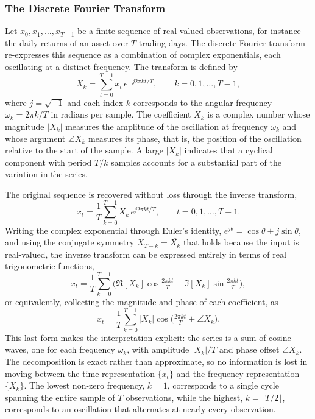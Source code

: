 \documentclass[12pt,a4paper]{article}
\begin{document}
\subsubsection{The Discrete Fourier Transform}
\label{sec:dft}

Let $x_0, x_1, \ldots, x_{T-1}$ be a finite sequence of real-valued
observations, for instance the daily returns of an asset over $T$ trading
days. The discrete Fourier transform re-expresses this sequence as a
combination of complex exponentials, each oscillating at a distinct
frequency. The transform is defined by
\begin{equation}
    X_k = \sum_{t=0}^{T-1} x_t \, e^{-j 2\pi k t / T},
    \qquad k = 0, 1, \ldots, T-1,
\end{equation}
where $j = \sqrt{-1}$ and each index $k$ corresponds to the angular
frequency $\omega_k = 2\pi k / T$ in radians per sample. The coefficient
$X_k$ is a complex number whose magnitude $|X_k|$ measures the amplitude
of the oscillation at frequency $\omega_k$ and whose argument $\angle X_k$
measures its phase, that is, the position of the oscillation relative to
the start of the sample. A large $|X_k|$ indicates that a cyclical
component with period $T/k$ samples accounts for a substantial part of
the variation in the series.

The original sequence is recovered without loss through the inverse
transform,
\begin{equation}
    x_t = \frac{1}{T} \sum_{k=0}^{T-1} X_k \, e^{j 2\pi k t / T},
    \qquad t = 0, 1, \ldots, T-1.
\end{equation}
Writing the complex exponential through Euler's identity, $e^{j\theta} =
\cos\theta + j\sin\theta$, and using the conjugate symmetry $X_{T-k} =
\overline{X_k}$ that holds because the input is real-valued, the inverse
transform can be expressed entirely in terms of real trigonometric
functions,
\begin{equation}
    x_t = \frac{1}{T} \sum_{k=0}^{T-1}
    \Big( \Re[X_k]\cos\tfrac{2\pi k t}{T}
    - \Im[X_k]\sin\tfrac{2\pi k t}{T} \Big),
\end{equation}
or equivalently, collecting the magnitude and phase of each coefficient,
as
\begin{equation}
    x_t = \frac{1}{T} \sum_{k=0}^{T-1}
    |X_k| \cos\!\Big( \tfrac{2\pi k t}{T} + \angle X_k \Big).
\end{equation}
This last form makes the interpretation explicit: the series is a sum of
cosine waves, one for each frequency $\omega_k$, with amplitude
$|X_k|/T$ and phase offset $\angle X_k$. The decomposition is exact
rather than approximate, so no information is lost in moving between the
time representation $\{x_t\}$ and the frequency representation $\{X_k\}$.
The lowest non-zero frequency, $k = 1$, corresponds to a single cycle
spanning the entire sample of $T$ observations, while the highest, $k =
\lfloor T/2 \rfloor$, corresponds to an oscillation that alternates at
nearly every observation.
\end{document}
